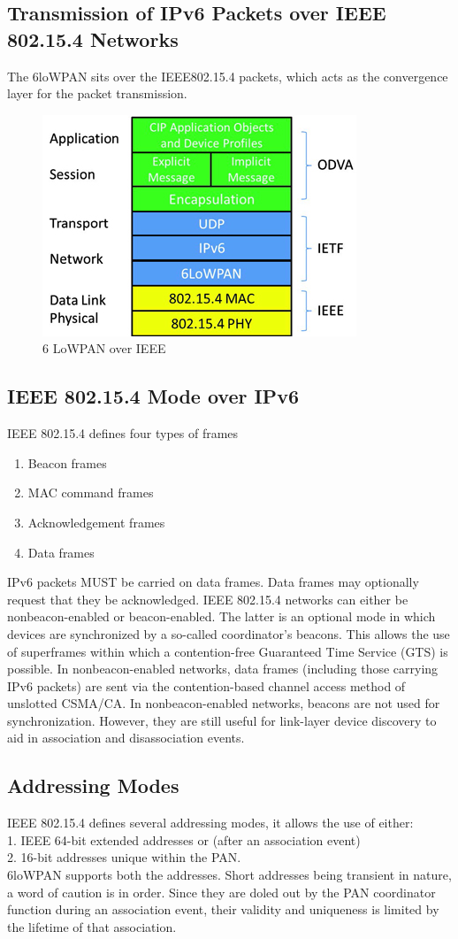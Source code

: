 \subsection{Transmission of IPv6 Packets over IEEE 802.15.4 Networks}
The 6loWPAN sits over the IEEE802.15.4 packets, which acts as the convergence layer for the packet transmission.
\begin{figure}[ht]
	\centering
	\includegraphics[scale=1]{images/6LoWPAN.png}
	\caption{6 LoWPAN over IEEE}
\end{figure}
\subsection{IEEE 802.15.4 Mode over IPv6} 
IEEE 802.15.4 defines four types of frames\\
\begin{enumerate}
	\item{Beacon frames}
	\item{MAC command frames}
	\item{Acknowledgement frames}
	\item{Data frames}
\end{enumerate}
IPv6 packets MUST be carried on data frames. Data frames may optionally request that they be acknowledged. IEEE 802.15.4 networks can either be nonbeacon-enabled or beacon-enabled.  The latter is an optional mode in which devices are synchronized by a so-called coordinator's beacons.  This allows the use of superframes within which a contention-free Guaranteed Time Service (GTS) is possible. In nonbeacon-enabled networks, data frames (including those carrying IPv6 packets) are sent via the contention-based channel access method of unslotted CSMA/CA. In nonbeacon-enabled networks, beacons are not used for synchronization. However, they are still useful for link-layer device discovery to aid in association and disassociation events.
\subsection{Addressing Modes}
IEEE 802.15.4 defines several addressing modes, it allows the use of either:\\
1. IEEE 64-bit extended addresses or (after an association event)\\
2. 16-bit addresses unique within the PAN.\\
6loWPAN supports both the addresses. Short addresses being transient in nature, a word of caution is in order. Since they are doled out by the PAN coordinator function during an association event, their validity and uniqueness is limited by the lifetime of that association.
